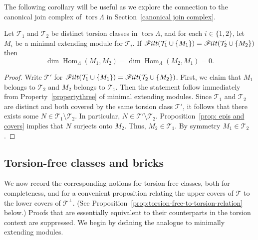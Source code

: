 \documentclass[ALCO,ThmDefs,Unicode,epreuves]{cedram}
\DeclareMathOperator{\tors}{tors}
\DeclareMathOperator{\Hom}{Hom}
\newcommand{\calT}{\mathcal{T}}
\newcommand{\filt}{\mathscr{F}\Mk ilt}
\renewcommand{\1}{\hat{1}}
\newcommand{\0}{\hat{0}}
\newcommand*{\Mk}{\mkern -2mu}
\begin{document}
The following corollary will be useful as we explore the connection to
the canonical join complex of $\tors \Lambda$ in
Section~\ref{canonical join complex}.
\begin{corollary}\label{hom orthogonality}
Let $\calT_1$ and $\calT_2$ be distinct torsion classes in $\tors \Lambda$, and for each $i\in \{1,2\}$, let $M_i$ be a minimal extending module for $\calT_i$.
If $\filt(\calT_1 \cup \{M_1\}) = \filt(\calT_2 \cup \{M_2\})$ then \[\dim \Hom_{\Lambda}(M_1,M_2) = \dim \Hom_{\Lambda}(M_2,M_1)=0.\]
\end{corollary}
\begin{proof}
Write $\calT'$ for $\filt(\calT_1 \cup \{M_1\}) = \filt(\calT_2 \cup \{M_2\})$.
First, we claim that $M_1$ belongs to $\calT_2$ and $M_2$ belongs to $\calT_1$.
Then the statement follow immediately from Property~\ref{propertythree} of minimal extending modules.
Since $\calT_1$ and $\calT_2$ are distinct and both covered by the same torsion class $\calT'$, it follows that there exists some $N\in \calT_1\setminus \calT_2$.
In particular, $N\in \calT'\setminus \calT_2$.
Proposition~\ref{prop: epis and covers} implies that $N$ surjects onto $M_2$.
Thus, $M_2\in \calT_1$.
By symmetry $M_1\in \calT_2$.
\end{proof}

\subsection{Torsion-free classes and bricks}
We now record the corresponding notions for
torsion-free classes, both for completeness, and for a convenient
proposition relating the upper covers of $\calT$ to the lower
covers of $\calT^\perp$.
(See Proposition~\ref{prop:torsion-free-to-torsion-relation} below.)
Proofs that are essentially equivalent to their counterparts in the
torsion context are suppressed.
We begin by defining the analogue to minimally extending modules.
\end{document}
